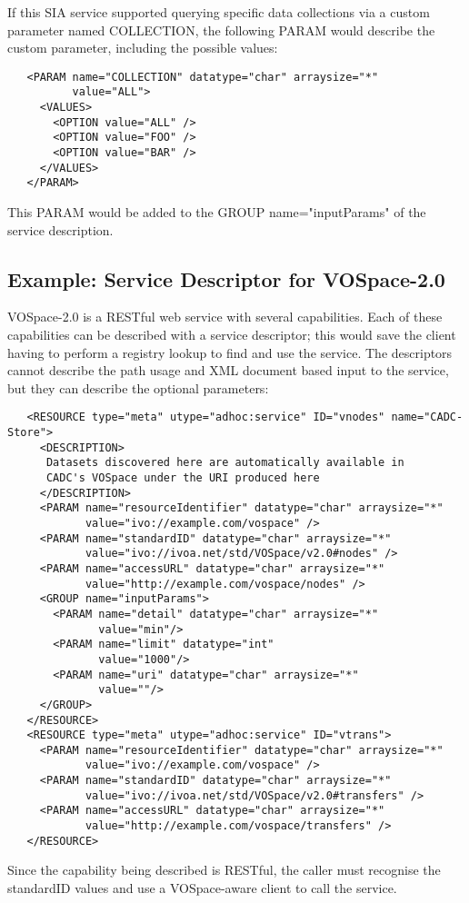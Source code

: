 \documentclass[11pt,a4paper]{ivoa}
\newcommand{\attval}[2]{#1={\allowbreak}{"}#2{"}}
\begin{document}
If this SIA service supported querying specific data collections via
a custom parameter named COLLECTION, the following PARAM would describe the
custom parameter, including the possible values:
\begin{verbatim}
   <PARAM name="COLLECTION" datatype="char" arraysize="*"
          value="ALL">
     <VALUES>
       <OPTION value="ALL" />
       <OPTION value="FOO" />
       <OPTION value="BAR" />
     </VALUES>
   </PARAM>
\end{verbatim}
This PARAM would be added to the GROUP \attval{name}{inputParams}
of the service description.


\subsection{Example: Service Descriptor for VOSpace-2.0}

VOSpace-2.0 is a RESTful web service with several capabilities. Each of
these capabilities can be described with a service descriptor; this would
save the client having to perform a registry lookup to find and use the
service. The descriptors cannot describe the path usage and XML document
based input to the service, but they can describe the optional parameters:
\begin{verbatim}
   <RESOURCE type="meta" utype="adhoc:service" ID="vnodes" name="CADC-Store">
     <DESCRIPTION>
      Datasets discovered here are automatically available in 
      CADC's VOSpace under the URI produced here
     </DESCRIPTION>
     <PARAM name="resourceIdentifier" datatype="char" arraysize="*"
            value="ivo://example.com/vospace" />
     <PARAM name="standardID" datatype="char" arraysize="*"
            value="ivo://ivoa.net/std/VOSpace/v2.0#nodes" />
     <PARAM name="accessURL" datatype="char" arraysize="*"
            value="http://example.com/vospace/nodes" />
     <GROUP name="inputParams">
       <PARAM name="detail" datatype="char" arraysize="*"
              value="min"/>
       <PARAM name="limit" datatype="int"
              value="1000"/>
       <PARAM name="uri" datatype="char" arraysize="*"
              value=""/>
     </GROUP>
   </RESOURCE>
   <RESOURCE type="meta" utype="adhoc:service" ID="vtrans">
     <PARAM name="resourceIdentifier" datatype="char" arraysize="*"
            value="ivo://example.com/vospace" />
     <PARAM name="standardID" datatype="char" arraysize="*"
            value="ivo://ivoa.net/std/VOSpace/v2.0#transfers" />
     <PARAM name="accessURL" datatype="char" arraysize="*"
            value="http://example.com/vospace/transfers" />
   </RESOURCE>
\end{verbatim}
Since the capability being described is RESTful, the
caller must recognise the standardID values and use a VOSpace-aware
client to call the service.
\end{document}
